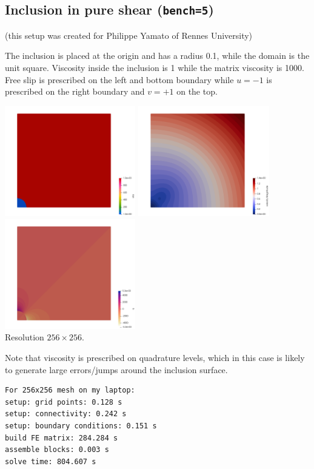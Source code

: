 \newpage
\subsection*{Inclusion in pure shear ({\tt bench=5})}

(this setup was created for Philippe Yamato of Rennes University)

The inclusion is placed at the origin and has a radius 0.1, while the domain is the 
unit square. Viscosity inside the inclusion is 1 while the matrix viscosity is 1000.
Free slip is prescribed on the left and bottom boundary while 
$u=-1$ is prescribed on the right boundary and $v=+1$ on the top.

\begin{center}
\includegraphics[width=5.7cm]{python_codes/fieldstone_18/results/inclusion/eta}
\includegraphics[width=5.7cm]{python_codes/fieldstone_18/results/inclusion/vel}
\includegraphics[width=5.7cm]{python_codes/fieldstone_18/results/inclusion/press}\\
{\captionfont Resolution $256\times 256$.}
\end{center}

Note that viscosity is prescribed on quadrature levels, which in this case 
is likely to generate large errors/jumps around the inclusion surface.

\begin{verbatim}
For 256x256 mesh on my laptop:
setup: grid points: 0.128 s
setup: connectivity: 0.242 s
setup: boundary conditions: 0.151 s
build FE matrix: 284.284 s
assemble blocks: 0.003 s
solve time: 804.607 s
\end{verbatim}



